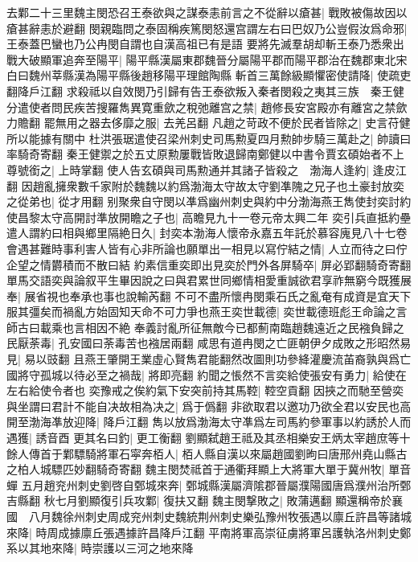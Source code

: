 去鄴二十三里魏主閔恐召王泰欲與之謀泰恚前言之不從辭以瘡甚|{
	戰敗被傷故因以瘡甚辭恚於避翻}
閔親臨問之泰固稱疾篤閔怒還宫謂左右曰巴奴乃公豈假汝爲命邪|{
	王泰蓋巴蠻也乃公冉閔自謂也自漢高祖已有是語}
要將先滅羣胡却斬王泰乃悉衆出戰大破顯軍追奔至陽平|{
	陽平縣漢屬東郡魏晉分屬陽平郡而陽平郡治在魏郡東北宋白曰魏州莘縣漢為陽平縣後趙移陽平理館陶縣}
斬首三萬餘級顯懼密使請降|{
	使疏吏翻降戶江翻}
求殺祗以自效閔乃引歸有告王泰欲叛入秦者閔殺之夷其三族　秦王健分遣使者問民疾苦搜羅雋異寛重歛之稅弛離宫之禁|{
	趙修長安宮殿亦有離宮之禁歛力贍翻}
罷無用之器去侈靡之服|{
	去羌呂翻}
凡趙之苛政不便於民者皆除之|{
	史言苻健所以能據有關中}
杜洪張琚遣使召梁州刺史司馬勲夏四月勲帥步騎三萬赴之|{
	帥讀曰率騎奇寄翻}
秦王健禦之於五丈原勲屢戰皆敗退歸南鄭健以中書令賈玄碩始者不上尊號銜之|{
	上時掌翻}
使人告玄碩與司馬勲通并其諸子皆殺之　渤海人逢約|{
	逢皮江翻}
因趙亂擁衆數千家附於魏魏以約爲渤海太守故太守劉凖隗之兄子也土豪封放奕之從弟也|{
	從才用翻}
别聚衆自守閔以凖爲幽州刺史與約中分渤海燕王雋使封奕討約使昌黎太守高開討準放開瞻之子也|{
	高瞻見九十一卷元帝太興二年}
奕引兵直抵約壘遣人謂約曰相與鄉里隔絶日久|{
	封奕本渤海人懷帝永嘉五年託於慕容廆見八十七卷}
會遇甚難時事利害人皆有心非所論也願單出一相見以寫佇結之情|{
	人立而待之曰佇企望之情欝積而不散曰結}
約素信重奕即出見奕於門外各屏騎卒|{
	屏必郢翻騎奇寄翻}
單馬交語奕與論叙平生畢因說之曰與君累世同鄉情相愛重誠欲君享祚無窮今既獲展奉|{
	展省視也奉承也事也說輸芮翻}
不可不盡所懷冉閔乘石氏之亂奄有成資是宜天下服其彊矣而禍亂方始固知天命不可力爭也燕王奕世載德|{
	奕世載德班彪王命論之言師古曰載乘也言相因不絶}
奉義討亂所征無敵今已都薊南臨趙魏遠近之民襁負歸之民厭荼毒|{
	孔安國曰荼毒苦也襁居兩翻}
咸思有道冉閔之亡匪朝伊夕成敗之形昭然易見|{
	易以豉翻}
且燕王肇開王業虛心賢雋君能翻然改圖則功參絳灌慶流苖裔孰與爲亡國將守孤城以待必至之禍哉|{
	將即亮翻}
約聞之悵然不言奕給使張安有勇力|{
	給使在左右給使令者也}
奕豫戒之俟約氣下安突前持其馬鞚|{
	鞚空貢翻}
因挾之而馳至營奕與坐謂曰君計不能自决故相為决之|{
	爲于僞翻}
非欲取君以邀功乃欲全君以安民也高開至渤海凖放迎降|{
	降戶江翻}
雋以放爲渤海太守凖爲左司馬約參軍事以約誘於人而遇獲|{
	誘音酉}
更其名曰釣|{
	更工衡翻}
劉顯弑趙王祗及其丞相樂安王炳太宰趙庶等十餘人傳首于鄴驃騎將軍石寜奔栢人|{
	栢人縣自漢以來屬趙國劉昫曰唐邢州堯山縣古之柏人城驃匹妙翻騎奇寄翻}
魏主閔焚祗首于通衢拜顯上大將軍大單于冀州牧|{
	單音蟬}
五月趙兖州刺史劉啓自鄄城來奔|{
	鄄城縣漢屬濟隂郡晉屬濮陽國唐爲濮州治所鄄吉縣翻}
秋七月劉顯復引兵攻鄴|{
	復扶又翻}
魏主閔撃敗之|{
	敗蒲邁翻}
顯還稱帝於襄國　八月魏徐州刺史周成兖州刺史魏統荆州刺史樂弘豫州牧張遇以廪丘許昌等諸城來降|{
	時周成據廪丘張遇據許昌降戶江翻}
平南將軍高崇征虜將軍呂護執洛州刺史鄭系以其地來降|{
	時崇護以三河之地來降}
